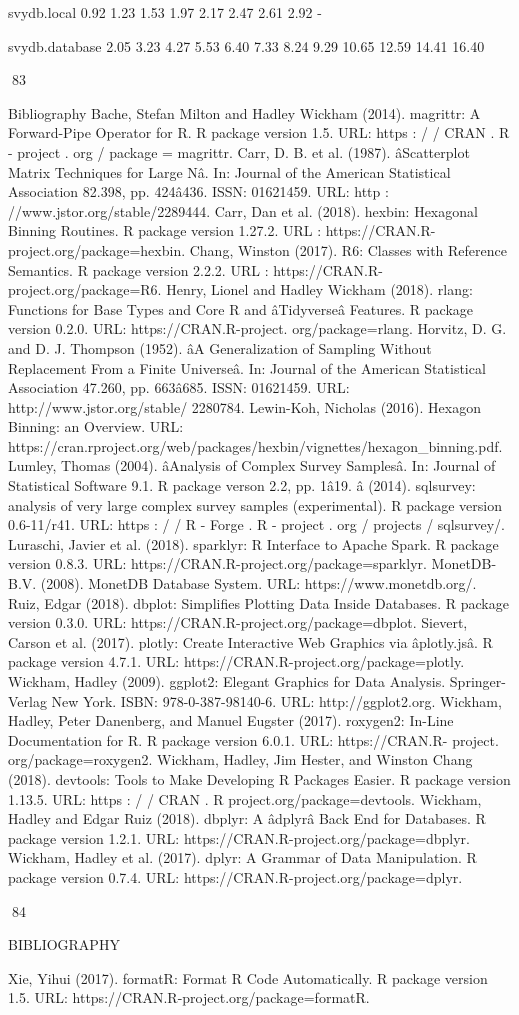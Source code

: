 svydb.local
0.92
1.23
1.53
1.97
2.17
2.47
2.61
2.92
-

svydb.database
2.05
3.23
4.27
5.53
6.40
7.33
8.24
9.29
10.65
12.59
14.41
16.40

83

Bibliography
Bache, Stefan Milton and Hadley Wickham (2014). magrittr: A Forward-Pipe Operator
for R. R package version 1.5. URL: https : / / CRAN . R - project . org / package =
magrittr.
Carr, D. B. et al. (1987). âScatterplot Matrix Techniques for Large Nâ. In: Journal of the
American Statistical Association 82.398, pp. 424â436. ISSN: 01621459. URL: http :
//www.jstor.org/stable/2289444.
Carr, Dan et al. (2018). hexbin: Hexagonal Binning Routines. R package version 1.27.2.
URL : https://CRAN.R-project.org/package=hexbin.
Chang, Winston (2017). R6: Classes with Reference Semantics. R package version 2.2.2.
URL : https://CRAN.R-project.org/package=R6.
Henry, Lionel and Hadley Wickham (2018). rlang: Functions for Base Types and Core R
and âTidyverseâ Features. R package version 0.2.0. URL: https://CRAN.R-project.
org/package=rlang.
Horvitz, D. G. and D. J. Thompson (1952). âA Generalization of Sampling Without
Replacement From a Finite Universeâ. In: Journal of the American Statistical Association 47.260, pp. 663â685. ISSN: 01621459. URL: http://www.jstor.org/stable/
2280784.
Lewin-Koh, Nicholas (2016). Hexagon Binning: an Overview. URL: https://cran.rproject.org/web/packages/hexbin/vignettes/hexagon_binning.pdf.
Lumley, Thomas (2004). âAnalysis of Complex Survey Samplesâ. In: Journal of Statistical Software 9.1. R package verson 2.2, pp. 1â19.
â (2014). sqlsurvey: analysis of very large complex survey samples (experimental). R package version 0.6-11/r41. URL: https : / / R - Forge . R - project . org / projects /
sqlsurvey/.
Luraschi, Javier et al. (2018). sparklyr: R Interface to Apache Spark. R package version
0.8.3. URL: https://CRAN.R-project.org/package=sparklyr.
MonetDB-B.V. (2008). MonetDB Database System. URL: https://www.monetdb.org/.
Ruiz, Edgar (2018). dbplot: Simplifies Plotting Data Inside Databases. R package version
0.3.0. URL: https://CRAN.R-project.org/package=dbplot.
Sievert, Carson et al. (2017). plotly: Create Interactive Web Graphics via âplotly.jsâ. R
package version 4.7.1. URL: https://CRAN.R-project.org/package=plotly.
Wickham, Hadley (2009). ggplot2: Elegant Graphics for Data Analysis. Springer-Verlag
New York. ISBN: 978-0-387-98140-6. URL: http://ggplot2.org.
Wickham, Hadley, Peter Danenberg, and Manuel Eugster (2017). roxygen2: In-Line
Documentation for R. R package version 6.0.1. URL: https://CRAN.R- project.
org/package=roxygen2.
Wickham, Hadley, Jim Hester, and Winston Chang (2018). devtools: Tools to Make Developing R Packages Easier. R package version 1.13.5. URL: https : / / CRAN . R project.org/package=devtools.
Wickham, Hadley and Edgar Ruiz (2018). dbplyr: A âdplyrâ Back End for Databases. R
package version 1.2.1. URL: https://CRAN.R-project.org/package=dbplyr.
Wickham, Hadley et al. (2017). dplyr: A Grammar of Data Manipulation. R package
version 0.7.4. URL: https://CRAN.R-project.org/package=dplyr.

84

BIBLIOGRAPHY

Xie, Yihui (2017). formatR: Format R Code Automatically. R package version 1.5. URL:
https://CRAN.R-project.org/package=formatR.

